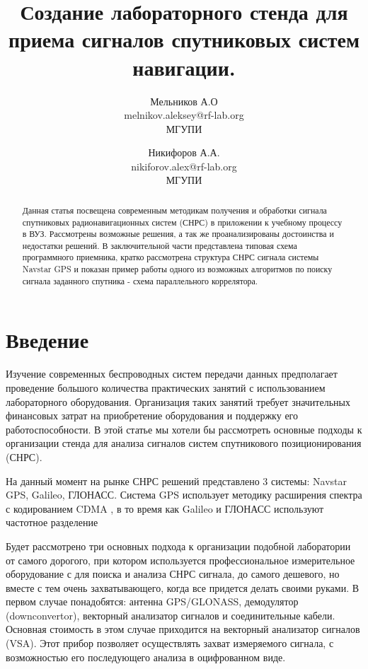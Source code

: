 \documentclass[a4paper,12pt]{article}
\numberwithin{table}{section}
\begin{document}
\title{Создание лабораторного стенда для приема сигналов спутниковых систем навигации.}
\author{Мельников А.О\\ melnikov.aleksey@rf-lab.org\\ МГУПИ \and Никифоров А.А.\\nikiforov.alex@rf-lab.org\\ МГУПИ}

\maketitle

\begin{abstract}
Данная статья посвещена современным методикам получения и обработки сигнала спутниковых радионавигационных систем (СНРС) в
приложении к учебному процессу в ВУЗ. Рассмотрены возможные решения, а так же проанализированы достоинства и недостатки
решений. В заключительной части представлена типовая схема программного приемника, кратко рассмотрена структура
СНРС сигнала системы Navstar GPS и показан пример работы одного из возможных алгоритмов по поиску сигнала заданного спутника - 
схема параллельного коррелятора. 
\end{abstract}

\section{Введение}
Изучение современных беспроводных систем передачи данных предполагает проведение большого количества
практических занятий с использованием лабораторного оборудования.
Организация таких занятий требует значительных финансовых затрат на приобретение оборудования и поддержку его работоспособности.
В этой статье мы хотели бы рассмотреть основные подходы к организации стенда для анализа сигналов систем спутникового позиционирования (СНРС).

На данный момент на рынке СНРС решений представлено 3 системы: Navstar GPS, Galileo, ГЛОНАСС. Система GPS использует методику
расширения спектра с кодированием CDMA \cite{gpsuserequipment}, в то время как Galileo и ГЛОНАСС используют частотное разделение \cite{galileo}
 
Будет рассмотрено три основных подхода к организации подобной лаборатории от самого дорогого, при котором используется профессиональное измерительное
оборудование с для поиска и анализа СНРС сигнала, до самого дешевого, но вместе с тем очень захватывающего, когда все придется делать своими руками.
В первом случае понадобятся: антенна GPS/GLONASS, демодулятор (downconvertor),
векторный анализатор сигналов и соединительные кабели. Основная стоимость в этом случае приходится на векторный анализатор сигналов (VSA).
Этот прибор позволяет осуществлять захват измеряемого сигнала, с возможностью его последующего анализа в оцифрованном виде.
\end{document}

